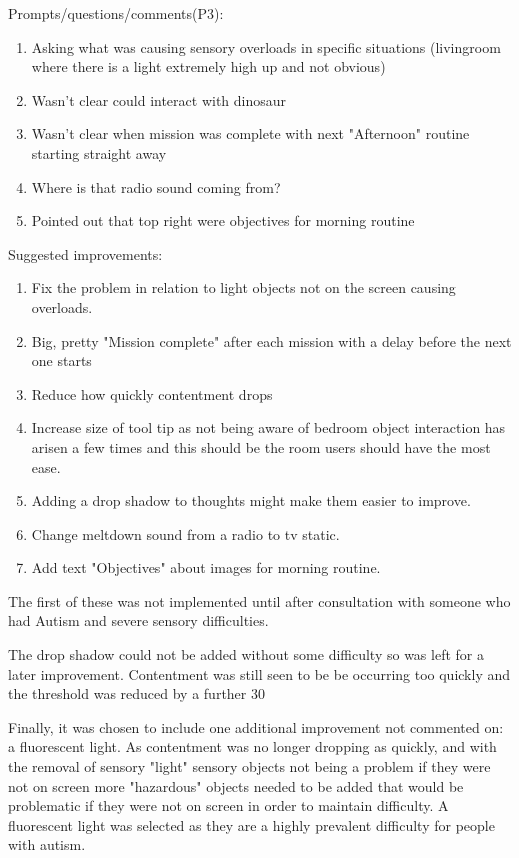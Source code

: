 Prompts/questions/comments(P3):
\begin{enumerate}
\item Asking what was causing sensory overloads in specific situations (livingroom where there is a light extremely high up and not obvious)
\item Wasn't clear could interact with dinosaur
\item Wasn't clear when mission was complete with next "Afternoon" routine starting straight away
\item Where is that radio sound coming from?
\item Pointed out that top right were objectives for morning routine
\end{enumerate}

Suggested improvements:
\begin{enumerate}
\item Fix the problem in relation to light objects not on the screen causing overloads.
\item Big, pretty "Mission complete" after each mission with a delay before the next one starts
\item Reduce how quickly contentment drops
\item Increase size of tool tip as not being aware of bedroom object interaction has arisen a few times and this should be the room users should have the most ease. 
\item Adding a drop shadow to thoughts might make them easier to improve.
\item Change meltdown sound from a radio to tv static. 
\item Add text "Objectives" about images for morning routine. 
\end{enumerate}

The first of these was not implemented until after consultation with someone who had Autism and severe sensory difficulties.

The drop shadow could not be added without some difficulty so was left for a later improvement. Contentment was still seen to be be occurring too quickly and the threshold was reduced by a further 30%

Finally, it was chosen to include one additional improvement not commented on: a fluorescent light. As contentment was no longer dropping as quickly, and with the removal of sensory "light" sensory objects not being a problem if they were not on screen more "hazardous" objects needed to be added that would be problematic if they were not on screen in order to maintain difficulty. A fluorescent light was selected as they are a highly prevalent difficulty for people with autism. 

